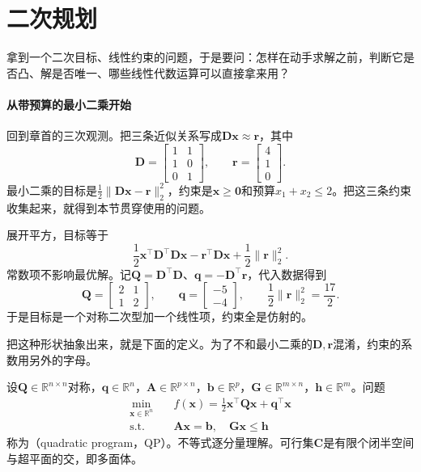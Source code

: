 \section{二次规划}
\label{sec:cone-qp}

拿到一个二次目标、线性约束的问题，于是要问：怎样在动手求解之前，判断它是否凸、解是否唯一、哪些线性代数运算可以直接拿来用？

\paragraph{从带预算的最小二乘开始}
回到章首的三次观测。把三条近似关系写成$\bm{D}\bm{x}\approx\bm{r}$，其中
\[
 \bm{D}=\begin{bmatrix}1&1\\1&0\\0&1\end{bmatrix},\qquad
 \bm{r}=\begin{bmatrix}4\\1\\0\end{bmatrix}.
\]
最小二乘的目标是$\frac12\lVert\bm{D}\bm{x}-\bm{r}\rVert_2^2$，约束是$\bm{x}\geq\bm{0}$和预算$x_1+x_2\leq2$。把这三条约束收集起来，就得到本节贯穿使用的问题。

展开平方，目标等于
\[
 \frac12\bm{x}^\top\bm{D}^\top\bm{D}\bm{x}-\bm{r}^\top\bm{D}\bm{x}+\frac12\lVert\bm{r}\rVert_2^2.
\]
常数项不影响最优解。记$\bm{Q}=\bm{D}^\top\bm{D}$、$\bm{q}=-\bm{D}^\top\bm{r}$，代入数据得到
\begin{equation}
 \bm{Q}=\begin{bmatrix}2&1\\1&2\end{bmatrix},\qquad
 \bm{q}=\begin{bmatrix}-5\\-4\end{bmatrix},\qquad
 \frac12\lVert\bm{r}\rVert_2^2=\frac{17}{2}.
 \label{eq:cone-running-data}
\end{equation}
于是目标是一个对称二次型加一个线性项，约束全是仿射的。

把这种形状抽象出来，就是下面的定义。为了不和最小二乘的$\bm{D},\bm{r}$混淆，约束的系数用另外的字母。

\begin{definition}[二次规划]
\label{def:cone-qp}
设$\bm{Q}\in\mathbb{R}^{n\times n}$对称，$\bm{q}\in\mathbb{R}^n$，$\bm{A}\in\mathbb{R}^{p\times n}$，$\bm{b}\in\mathbb{R}^p$，$\bm{G}\in\mathbb{R}^{m\times n}$，$\bm{h}\in\mathbb{R}^m$。问题
\begin{equation}
 \begin{aligned}
 \min_{\bm{x}\in\mathbb{R}^n}\quad&f(\bm{x})=\frac12\bm{x}^\top\bm{Q}\bm{x}+\bm{q}^\top\bm{x}\\
 \text{s.t.}\quad&\bm{A}\bm{x}=\bm{b},\quad\bm{G}\bm{x}\leq\bm{h}
 \end{aligned}
 \label{eq:cone-qp}
\end{equation}
称为（quadratic program，QP）。不等式逐分量理解。可行集$\bm{C}$是有限个闭半空间与超平面的交，即多面体。
\end{definition}

